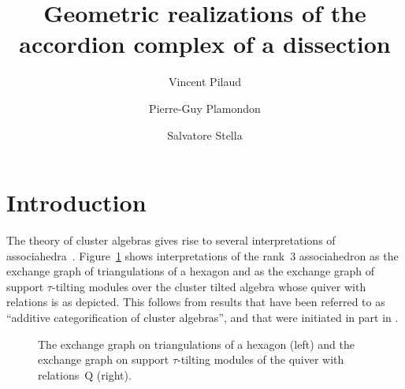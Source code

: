 \documentclass{amsart}
\title[Geometric realizations of the accordion complex of a dissection]{Geometric realizations of the \\ accordion complex of a dissection}
\author{Vincent Pilaud}
\author{Pierre-Guy Plamondon}
\author{Salvatore Stella}
\theoremstyle{definition}
\renewcommand{\b}[1]{\mathbf{#1}} %
\newcommand{\fref}[1]{Figure~\ref{#1}} %
\newcommand{\dissection}{\mathrm{D}} %
\newcommand{\quiver}{\mathrm{Q}} %
\begin{document}
\begin{abstract}
%
\end{abstract}


\maketitle{}


\section{Introduction}

The theory of cluster algebras gives rise to several interpretations of associahedra~\mbox{\cite{Tamari, Stasheff}}. \fref{fig:associahedron} shows interpretations of the rank~$3$ associahedron as the exchange graph of triangulations of a hexagon and as the exchange graph of support $\tau$-tilting modules over the cluster tilted algebra whose quiver with relations is as depicted. 
This follows from results that have been referred to as ``additive categorification of cluster algebras'', and that were initiated in part in \cite{BMRRT}.

\begin{figure}
	\capstart
	\centerline{\associahedronAccordionTikz{}\associahedronSiltingTikz{}}
	\caption{The exchange graph on triangulations of a hexagon (left) and the exchange graph on support $\tau$-tilting modules of the quiver with relations~$\quiver$ (right).}
	\label{fig:associahedron}
\end{figure}
\end{document}
